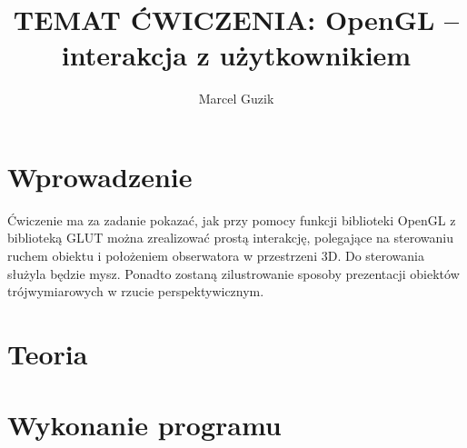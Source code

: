 \documentclass[a4paper]{article}
\title{TEMAT ĆWICZENIA: OpenGL – interakcja z użytkownikiem}
\author{Marcel Guzik}
\begin{document}
\maketitle
\clearpage

\section{Wprowadzenie}
Ćwiczenie ma za zadanie pokazać, jak przy pomocy funkcji biblioteki OpenGL z
biblioteką GLUT można zrealizować prostą interakcję, polegające na sterowaniu
ruchem obiektu i położeniem obserwatora w przestrzeni 3D. Do sterowania służyla
będzie mysz. Ponadto zostaną zilustrowanie sposoby prezentacji obiektów
trójwymiarowych w rzucie perspektywicznym.

\section{Teoria}


\section{Wykonanie programu}
\end{document}
